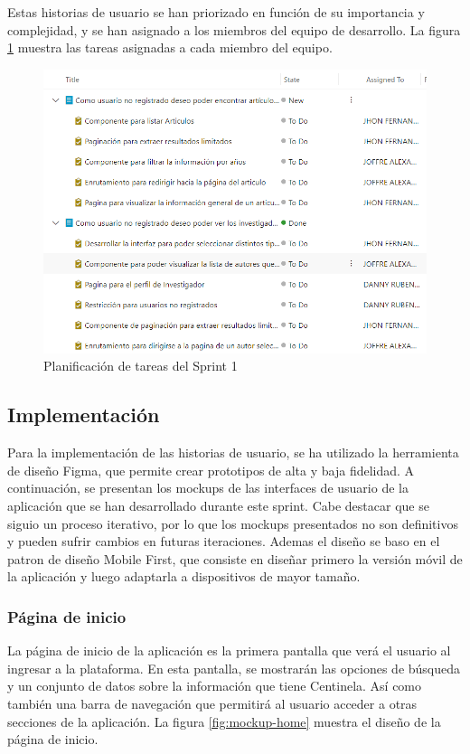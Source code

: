 Estas historias de usuario se han priorizado en función de su importancia y complejidad, y se han asignado a los miembros del equipo de desarrollo. La figura \ref{fig:azure-board-sprint-1} muestra las tareas asignadas a cada miembro del equipo.
\begin{figure}[H]
    \centering
    \includegraphics[scale=0.9]{../02Figures/02Chapter/Sprints/Sprint-1/fig_azure-board-sprint-1.png}
    \caption{Planificación de tareas del Sprint 1}
    \label{fig:azure-board-sprint-1}
\end{figure}

\subsection{Implementación}
Para la implementación de las historias de usuario, se ha utilizado la herramienta de diseño Figma, que permite crear prototipos de alta y baja fidelidad. 
A continuación, se presentan los mockups de las interfaces de usuario de la aplicación que se han desarrollado durante este sprint.
Cabe destacar que se siguio un proceso iterativo, por lo que los mockups presentados no son definitivos y pueden sufrir cambios en futuras iteraciones.
Ademas el diseño se baso en el patron de diseño Mobile First, que consiste en diseñar primero la versión móvil de la aplicación y luego adaptarla a dispositivos de mayor tamaño.

\subsubsection{Página de inicio}
La página de inicio de la aplicación es la primera pantalla que verá el usuario al ingresar a la plataforma. 
En esta pantalla, se mostrarán las opciones de búsqueda y un conjunto de datos sobre la información que tiene Centinela. Así como también una barra de navegación que permitirá al usuario acceder a otras secciones de la aplicación. 
La figura \ref{fig:mockup-home} muestra el diseño de la página de inicio.

